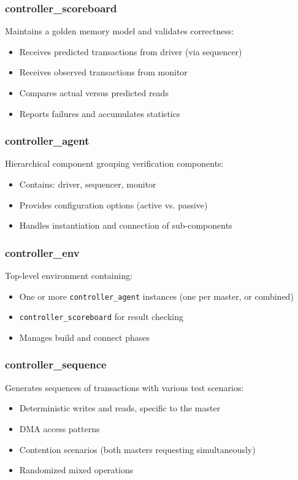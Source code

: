 \documentclass{article}
\begin{document}
\subsubsection{controller\_scoreboard}

Maintains a golden memory model and validates correctness:
\begin{itemize}
    \item Receives predicted transactions from driver (via sequencer)
    \item Receives observed transactions from monitor
    \item Compares actual versus predicted reads
    \item Reports failures and accumulates statistics
\end{itemize}

\subsubsection{controller\_agent}

Hierarchical component grouping verification components:
\begin{itemize}
    \item Contains: driver, sequencer, monitor
    \item Provides configuration options (active vs. passive)
    \item Handles instantiation and connection of sub-components
\end{itemize}

\subsubsection{controller\_env}

Top-level environment containing:
\begin{itemize}
    \item One or more \texttt{controller\_agent} instances (one per master, or combined)
    \item \texttt{controller\_scoreboard} for result checking
    \item Manages build and connect phases
\end{itemize}

\subsubsection{controller\_sequence}

Generates sequences of transactions with various test scenarios:
\begin{itemize}
    \item Deterministic writes and reads, specific to the master
    \item DMA access patterns
    \item Contention scenarios (both masters requesting simultaneously)
    \item Randomized mixed operations
\end{itemize}
\end{document}
